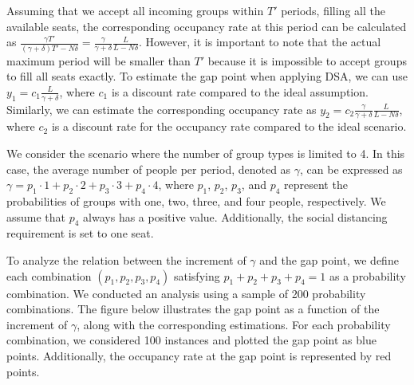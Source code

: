 Assuming that we accept all incoming groups within $T'$ periods, filling all the available seats, the corresponding occupancy rate at this period can be calculated as $\frac{\gamma T'}{(\gamma+ \delta)T' - N \delta} = \frac{\gamma}{\gamma +\delta} \frac{L}{L-N \delta}$. However, it is important to note that the actual maximum period will be smaller than $T{'}$ because it is impossible to accept groups to fill all seats exactly. To estimate the gap point when applying DSA, we can use $y_1 = c_1 \frac{L}{\gamma + \delta}$, where $c_1$ is a discount rate compared to the ideal assumption. Similarly, we can estimate the corresponding occupancy rate as $y_2 = c_2 \frac{\gamma}{\gamma +\delta} \frac{L}{L-N \delta}$, where $c_2$ is a discount rate for the occupancy rate compared to the ideal scenario.




We consider the scenario where the number of group types is limited to 4. In this case, the average number of people per period, denoted as $\gamma$, can be expressed as $\gamma = p_1 \cdot 1 + p_2 \cdot 2 + p_3 \cdot 3 + p_4 \cdot 4$, where $p_1$, $p_2$, $p_3$, and $p_4$ represent the probabilities of groups with one, two, three, and four people, respectively. We assume that $p_4$ always has a positive value. Additionally, the social distancing requirement is set to one seat.

To analyze the relation between the increment of $\gamma$ and the gap point, we define each combination $(p_1, p_2, p_3, p_4)$ satisfying $p_1 + p_2 + p_3 + p_4 = 1$ as a probability combination. We conducted an analysis using a sample of 200 probability combinations. The figure below illustrates the gap point as a function of the increment of $\gamma$, along with the corresponding estimations. For each probability combination, we considered 100 instances and plotted the gap point as blue points. Additionally, the occupancy rate at the gap point is represented by red points.

